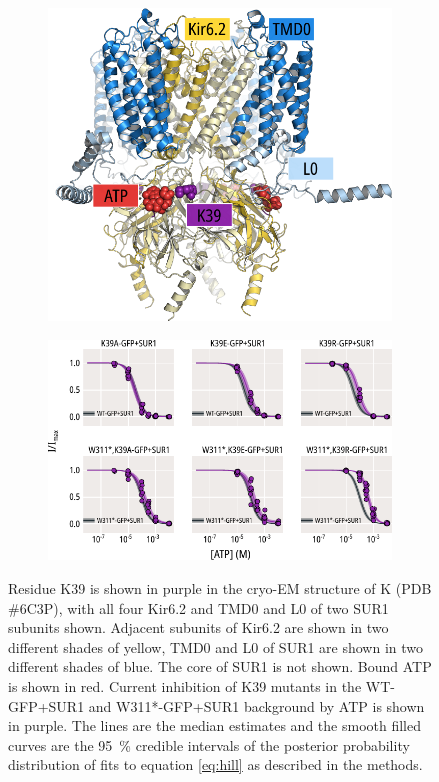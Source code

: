 \begin{figure}[hbtp]
	\centering
	\begin{subfigure}[t]{0.45\textwidth}
		\caption{}\label{ch5fig:k39_loc}
		\centering
		\includegraphics[width=\textwidth]{k39_1.pdf}
	\end{subfigure}
	\vfill
	\begin{subfigure}[t]{0.9\textwidth}
		\caption{}\label{ch5fig:k39_atp_popfits}
		\centering
		\includegraphics[width=\textwidth]{k39_2.pdf}
	\end{subfigure}
	\caption[Functional effects of K39 mutations on ATP inhibition]{
	 Residue K39 is shown in purple in the cryo-EM structure of K\ATP{} (PDB \#6C3P), with all four Kir6.2 and TMD0 and L0 of two SUR1 subunits shown.
	Adjacent subunits of Kir6.2 are shown in two different shades of yellow, TMD0 and L0 of SUR1 are shown in two different shades of blue.
	The core of SUR1 is not shown.
	Bound ATP is shown in red.
	 Current inhibition of K39 mutants in the WT-GFP+SUR1 and W311*-GFP+SUR1 background by ATP is shown in purple.
	The lines are the median estimates and the smooth filled curves are the \SI{95}{\percent} credible intervals of the posterior probability distribution of fits to equation \ref{eq:hill} as described in the methods.
	}\label{ch5fig:k39_1}
\end{figure}

